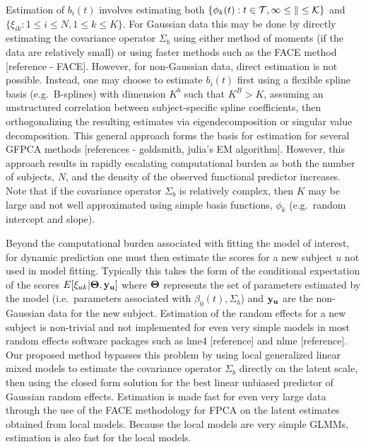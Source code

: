 \documentclass[
  11pt,
]{article}
\begin{document}
Estimation of \(b_i(t)\) involves estimating both
\(\{\phi_k(t): t \in \cal{T}, 1 \leq k \leq K\}\) and
\(\{\xi_{ik}: 1 \leq i \leq N, 1 \leq k \leq K\}\). For Gaussian data
this may be done by directly estimating the covariance operator
\(\Sigma_b\) using either method of moments (if the data are relatively
small) or using faster methods such as the FACE method {[}reference -
FACE{]}. However, for non-Gaussian data, direct estimation is not
possible. Instead, one may choose to estimate \(b_i(t)\) first using a
flexible spline basis (e.g.~B-splines) with dimension \(K^b\) such that
\(K^B > K\), assuming an unstructured correlation between
subject-specific spline coefficients, then orthogonalizing the resulting
estimates via eigendecomposition or singular value decomposition. This
general approach forms the basis for estimation for several GFPCA
methods {[}references - goldsmith, julia's EM algorithm{]}. However,
this approach results in rapidly escalating computational burden as both
the number of subjects, \(N\), and the density of the observed
functional predictor increases. Note that if the covariance operator
\(\Sigma_b\) is relatively complex, then \(K\) may be large and not well
approximated using simple basis functions, \(\phi_k\) (e.g.~random
intercept and slope).

Beyond the computational burden associated with fitting the model of
interest, for dynamic prediction one must then estimate the scores for a
new subject \(u\) not used in model fitting. Typically this takes the
form of the conditional expectation of the scores
\(E[\xi_{uk}|\bf{\Theta}, \bf{y}_{u}]\) where \(\bf{\Theta}\) represents
the set of parameters estimated by the model (i.e.~parameters associated
with \(\beta_0(t), \Sigma_b\)) and \(\bf{y}_u\) are the non-Gaussian
data for the new subject. Estimation of the random effects for a new
subject is non-trivial and not implemented for even very simple models
in most random effects software packages such as lme4 {[}reference{]}
and nlme {[}reference{]}. Our proposed method bypasses this problem by
using local generalized linear mixed models to estimate the covariance
operator \(\Sigma_b\) directly on the latent scale, then using the
closed form solution for the best linear unbiased predictor of Gaussian
random effects. Estimation is made fast for even very large data through
the use of the FACE methodology for FPCA on the latent estimates
obtained from local models. Because the local models are very simple
GLMMs, estimation is also fast for the local models.
\end{document}
